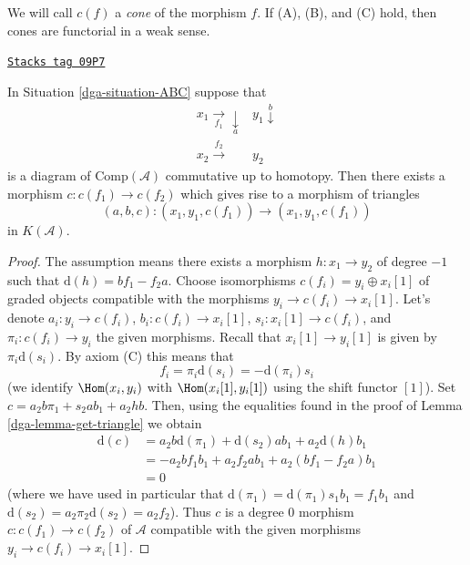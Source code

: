 We will call $c(f)$ a {\it cone} of the morphism $f$.
If (A), (B), and (C) hold, then
cones are functorial in a weak sense.

\begin{lemma}
\label{dga-lemma-cone}
\href{https://stacks.math.columbia.edu/tag/09P7}{\texttt{Stacks tag 09P7}}


In Situation \ref{dga-situation-ABC} suppose that
$$
\begin{array}{cc}x_1 \underset{f_1}{\longrightarrow}\underset{a}{\downarrow} & y_1 \overset{b}{\downarrow} \\ x_2 \overset{f_2}{\longrightarrow} & y_2\end{array}
$$
is a diagram of $\text{Comp}(\mathcal{A})$ commutative up to homotopy.
Then there exists a morphism $c : c(f_1) \to c(f_2)$ which gives rise to
a morphism of triangles
$$
(a, b, c) : (x_1, y_1, c(f_1)) \to (x_1, y_1, c(f_1))
$$
in $K(\mathcal{A})$.
\end{lemma}

\begin{proof}

The assumption means there exists a morphism $h : x_1 \to y_2$ of degree
$-1$ such that $\text{d}(h) = b f_1 - f_2 a$. Choose isomorphisms
$c(f_i) = y_i \oplus x_i[1]$ of graded objects compatible with the
morphisms $y_i \to c(f_i) \to x_i[1]$. Let's denote
$a_i : y_i \to c(f_i)$, $b_i : c(f_i) \to x_i[1]$, $s_i : x_i[1] \to c(f_i)$,
and $\pi_i : c(f_i) \to y_i$ the given morphisms. Recall that
$x_i[1] \to y_i[1]$ is given by $\pi_i \text{d}(s_i)$. By axiom (C)
this means that
$$
f_i = \pi_i \text{d}(s_i) = - \text{d}(\pi_i) s_i
$$
(we identify $\Hom(x_i, y_i)$ with $\Hom(x_i[1], y_i[1])$
using the shift functor $[1]$).
Set $c = a_2 b \pi_1 + s_2 a b_1 + a_2hb$. Then, using the
equalities found in the proof of Lemma \ref{dga-lemma-get-triangle}
we obtain
\begin{align*}
\text{d}(c)
& =
a_2 b \text{d}(\pi_1) + \text{d}(s_2) a b_1 + a_2 \text{d}(h) b_1 \\
& =
- a_2 b f_1 b_1 + a_2 f_2 a b_1 + a_2 (b f_1 - f_2 a) b_1 \\
& = 0
\end{align*}
(where we have used in particular that
$\text{d}(\pi_1) = \text{d}(\pi_1) s_1 b_1 = f_1 b_1$ and
$\text{d}(s_2) = a_2 \pi_2 \text{d}(s_2) = a_2 f_2$).
Thus $c$ is a degree $0$ morphism $c : c(f_1) \to c(f_2)$ of $\mathcal{A}$
compatible with the given morphisms $y_i \to c(f_i) \to x_i[1]$.
\end{proof}

